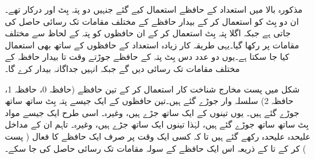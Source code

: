 مذکورہ بالا میں  استعداد کے حافظے استعمال کیے گئے جنہیں دو پتہ بِٹ  اور  درکار تھے۔ان دو بِٹ کو استعمال کر کے بیدار حافظے کے مختلف مقامات تک رسائی حاصل کی جاتی ہے جبکہ اگلا پتہ بِٹ  استعمال کر کے ان حافظوں کو پتہ کے لحاظ سے مختلف مقامات پر رکھا گیا۔یہی طریقہ کار زیادہ استعداد کے حافظوں کے ساتھ بھی استعمال کیا جا سکتا ہے۔یوں دو عدد دس بِٹ پتہ کے حافظے جوڑتے وقت  تا  بیدار حافظہ کے مختلف مقامات تک رسائی دیں گے جبکہ  انہیں جداگانہ بیدار کرے گا۔ 

شکل   میں پست مخارج شناخت کار استعمال کر کے تین  حافظے (حافظہ 0، حافظہ 1، حافظہ 2) سلسلہ وار جوڑے گئے ہیں۔تین حافظوں کے ایک جیسے پتہ بِٹ ساتھ ساتھ جوڑے گئے ہیں۔ یوں تینوں کے  ایک ساتھ جڑے ہیں، وغیرہ۔ اسی طرح ایک جیسے مواد بِٹ ساتھ ساتھ جوڑے گئے ہیں، لہٰذا تینوں  ایک ساتھ جڑے ہیں، وغیرہ۔ تاہم ان کے  مداخل علیحدہ علیحدہ رکھے گئے ہیں تا کہ کسی ایک وقت پر صرف ایک حافظے کا  فعال ( پست ) کر کے  تا  کے ذریعہ اس ایک حافظے کے سولہ مقامات تک رسائی حاصل کی جا سکے۔

